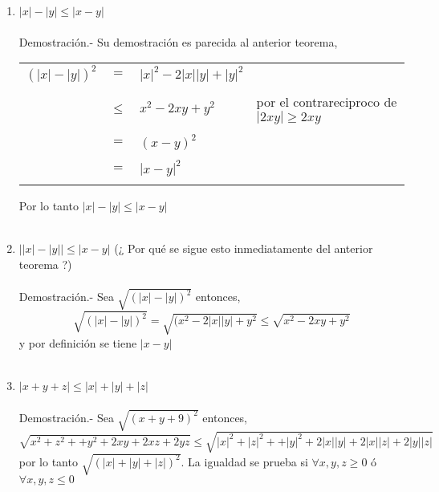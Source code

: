 \begin{enumerate}[\bfseries 1.]
\begin{enumerate}[\bfseries (i)]
\item $|x|-|y|\leq |x-y|$\\\\
Demostración.- \; Su demostración es parecida al anterior teorema, 
\begin{center}
\begin{tabular}{r c l l}
$(|x|-|y|)^2$&$=$&$|x|^2-2|x||y|+|y|^2$&\\\\
&$\leq$&$x^2-2xy+y^2$& por el contrareciproco de $|2xy|\geq 2xy$\\\\
&$=$&$(x-y)^2$&\\\\
&$=$&$|x-y|^2$&\\\\
\end{tabular}
\end{center}
Por lo tanto $|x|-|y|\leq |x-y|$\\\\

\item $\left| |x|-|y| \right| \leq |x-y|$ (¿ Por qué se sigue esto inmediatamente del anterior teorema ?)\\\\
Demostración.- \;  Sea $\sqrt{(|x|-|y|)^2}$ entonces, $$\sqrt{(|x|-|y|)^2}=\sqrt{(x^2-2|x||y|+y^2}\leq \sqrt{x^2-2xy+y^2}$$ y por definición se tiene $|x-y|$\\\\

\item $|x+y+z| \leq |x|+|y|+|z|$\\\\
Demostración.- \: Sea $\sqrt{(x+y+9)^2}$ entonces,  $$\sqrt{x^2+z^2++y^2+2xy+2xz+2yz} \leq \sqrt{|x|^2+|z|^2++|y|^2+2|x||y|+2|x||z|+2|y||z|}$$ por lo tanto $\sqrt{(|x|+|y|+|z|)^2}$. La igualdad se prueba si $\forall x,y,z \geq 0$ ó $\forall x,y,z \leq 0$\\\\
\end{enumerate}


\end{enumerate}
